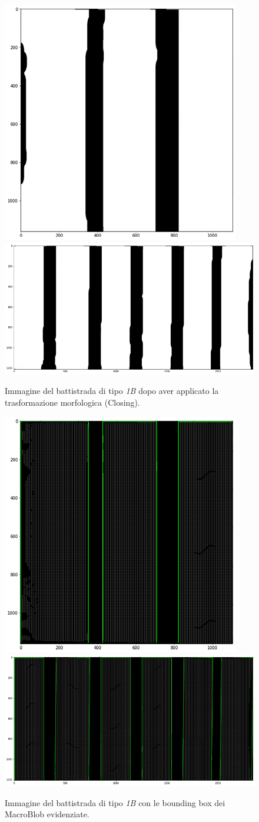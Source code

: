 \begin{figure}[H]
	\centering
	\includegraphics[height=0.32\columnwidth]{./pictures/batt_1b_analisi_1_7.png}
	\includegraphics[height=0.32\columnwidth]{./pictures/batt_1b_analisi_2_7.png}
	\caption{Immagine del battistrada di tipo \textit{1B} dopo aver applicato la trasformazione morfologica (Closing).}\label{fig:batt_1b_analisi_7}
\end{figure}

\begin{figure}[H]
	\centering
	\includegraphics[height=0.32\columnwidth]{./pictures/batt_1b_analisi_1_8.png}
	\includegraphics[height=0.32\columnwidth]{./pictures/batt_1b_analisi_2_8.png}
	\caption{Immagine del battistrada di tipo \textit{1B} con le bounding box dei MacroBlob evidenziate.}\label{fig:batt_1b_analisi_8}
\end{figure}



